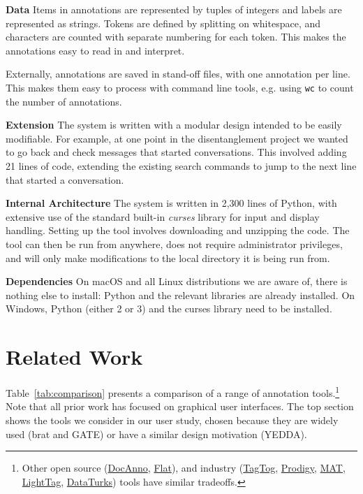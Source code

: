 \documentclass[11pt,a4paper]{article}
\makeatletter
\newcommand{\myeg}{e.g.\@\xspace}
\newcommand{\tightparagraph}[1]{\noindent\textbf{#1}}
\newcommand{\unixcmd}[1]{\texttt{#1}}
\makeatother
\begin{document}
\tightparagraph{Data}
Items in annotations are represented by tuples of integers and labels are represented as strings.
Tokens are defined by splitting on whitespace, and characters are counted with separate numbering for each token.
This makes the annotations easy to read in and interpret.

Externally, annotations are saved in stand-off files, with one annotation per line.
This makes them easy to process with command line tools, \myeg using \unixcmd{wc} to count the number of annotations.

\tightparagraph{Extension}
The system is written with a modular design intended to be easily modifiable.
For example, at one point in the disentanglement project we wanted to go back and check messages that started conversations.
This involved adding 21 lines of code, extending the existing search commands to jump to the next line that started a conversation.

\tightparagraph{Internal Architecture}
The system is written in 2,300 lines of Python, with extensive use of the standard built-in \emph{curses} library for input and display handling.
Setting up the tool involves downloading and unzipping the code.
The tool can then be run from anywhere, does not require administrator privileges, and will only make modifications to the local directory it is being run from.

\tightparagraph{Dependencies}
On macOS and all Linux distributions we are aware of, there is nothing else to install: Python and the relevant libraries are already installed.
On Windows, Python (either 2 or 3) and the curses library need to be installed.

\section{Related Work}

Table~\ref{tab:comparison} presents a comparison of a range of annotation tools.\footnote{
  Other open source (\href{https://github.com/chakki-works/doccano}{DocAnno}, \href{https://github.com/proycon/flat}{Flat}), and industry 
    (\href{https://www.tagtog.net/}{TagTog}, \href{https://prodi.gy/}{Prodigy}, \href{http://mat-annotation.sourceforge.net/}{MAT}, \href{https://www.lighttag.io/}{LightTag}, \href{https://dataturks.com/}{DataTurks})
    tools have similar tradeoffs.
}
Note that all prior work has focused on graphical user interfaces.
The top section shows the tools we consider in our user study, chosen because they are widely used (brat and GATE) or have a similar design motivation (YEDDA).
\end{document}
